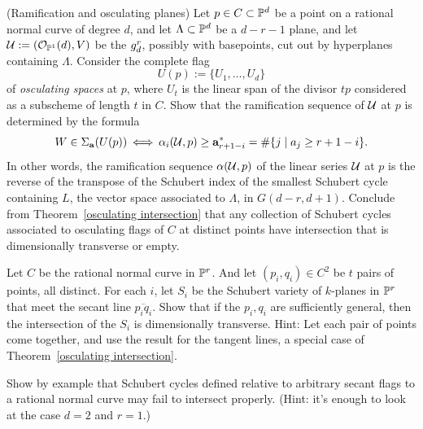 \begin{exercise}(Ramification and osculating planes)\label{osculating planes}
Let $p\in C\subset \mathbb P^{d}$ be a point on a rational normal curve of degree $d$, and
let $\Lambda\subset \mathbb P^{d}$ be a $d-r-1$ plane, and let  $\mathcal U :=({\mathcal O}_{\mathbb P^{1}}(d), V)$
be
the  ${g^{r}_{d}}$,  possibly with basepoints, cut out by hyperplanes containing $\Lambda$. 
Consider the complete flag 
$$
U(p) := \{U_{1}, \dots, U_{d}\}
$$
of \emph{osculating spaces} at $p$, where $U_{t}$ is the linear span of the divisor $tp$ considered
as a subscheme of length $t$ in $C$. Show that the ramification sequence of $\mathcal U$ at $p$
is determined by the formula
$$
W \in \Sigma_{\bf a}({U(p)}) \; \iff \; \alpha_i(\sU, p) \geq {\bf a}^*_{r+1-i} = \#\{j\mid a_j\geq r+1-i\}.
$$
In other words, the ramification sequence $\alpha(\mathcal U, p)$ of the linear series $\mathcal U$ at $p$ is the reverse of the transpose of the Schubert index of the smallest Schubert cycle containing $L$, the vector
space associated to $\Lambda$, in  $G(d-r, d+1)$. Conclude from Theorem~\ref{osculating intersection}
that any collection of Schubert cycles associated to osculating flags of $C$ at distinct points have intersection
that is dimensionally transverse or empty.
\end{exercise}

\begin{exercise}
Let $C$ be the rational normal curve in $\mathbb P^{r}$. And let $(p_{i}, q_{i})\in  C^{2}$ be $t$ pairs of points, all distinct.
For each $i$, let $S_{i}$ be the Schubert variety of $k$-planes in $\mathbb P^{r}$ that meet the secant line
$\overline{p_{i}q_{i}}$. Show that if the $p_{i}, q_{i}$ are sufficiently general, then the intersection
of the $S_{i}$ is dimensionally transverse. Hint: Let each pair of points come together, and use the result
for the tangent lines, a special case of Theorem~\ref{osculating intersection}.
\end{exercise}

\begin{exercise}\label{only general secants}
Show by example that Schubert cycles defined relative to arbitrary secant flags to a rational normal curve may fail to intersect properly. (Hint: it's enough to look at the case $d=2$ and $r=1$.)
\end{exercise}

